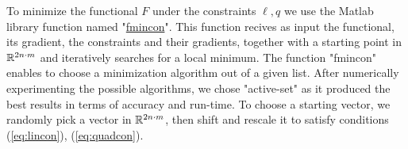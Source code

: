 \documentclass[../capacities_main.tex]{subfiles}
\begin{document}
	To minimize the functional $F$ under the constraints $\ell,q$ we use the Matlab library function named "\href{http://www.mathworks.com/help/optim/ug/fmincon.html}{fmincon}". This function recives as input the functional, its gradient, the constraints and their gradients, together with a starting point in  ${\mathbb R}^{2n\cdot m}$ and iteratively searches for a local minimum. The function "fmincon" enables to choose a minimization algorithm out of a given list. After numerically experimenting the possible algorithms, we chose "active-set" as it produced the best results in terms of accuracy and run-time. To choose a starting vector, we randomly pick a vector in ${\mathbb R}^{2n\cdot m}$, then shift and rescale it to satisfy conditions (\ref{eq:lincon}), (\ref{eq:quadcon}).
	
\end{document}
